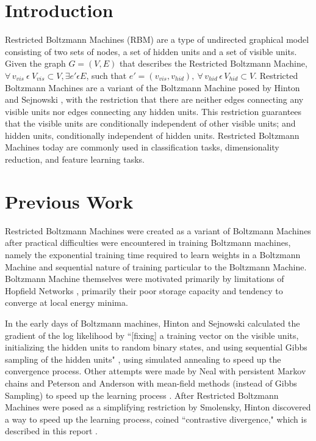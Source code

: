 \documentclass[journal]{IEEEtran}
\begin{document}
\section{Introduction}
Restricted Boltzmann Machines (RBM) are a type of undirected graphical model consisting of two sets of nodes, a set of hidden units and a set of visible units.  Given the graph $G = (V,E)$ that describes the Restricted Boltzmann Machine, $\forall \, v_{vis} \: \epsilon \: V_{vis} \subset V,\exists e'\epsilon E$, such that $ e'=(v_{vis}, v_{hid}),\: \forall \, v_{hid} \, \epsilon \, V_{hid} \subset V$.  Restricted Boltzmann Machines are a variant of the Boltzmann Machine posed by Hinton and Sejnowski \cite{ackley1985learning}, with the restriction that there are neither edges connecting any visible units nor edges connecting any hidden units.  This restriction guarantees that the visible units are conditionally independent of other visible units; and hidden units, conditionally independent of hidden units. Restricted Boltzmann Machines today are commonly used in classification tasks, dimensionality reduction, and feature learning tasks.

\section{Previous Work}
Restricted Boltzmann Machines were created as a variant of Boltzmann Machines after practical difficulties were encountered in training Boltzmann machines, namely the exponential training time required to learn weights in a Boltzmann Machine and sequential nature of training particular to the Boltzmann Machine.  Boltzmann Machine themselves were motivated primarily by limitations of Hopfield Networks \cite{hopfield1985neural}, primarily their poor storage capacity and tendency to converge at local energy minima.  

In the early days of Boltzmann machines, Hinton and Sejnowski calculated the gradient of the log likelihood by ``[fixing] a training vector on the visible units, initializing the hidden units to random binary states, and using sequential Gibbs sampling of the hidden units" \cite{ackley1985learning}, using simulated annealing to speed up the convergence process.  Other attempts were made by Neal with persistent Markov chains \cite{neal1992connectionist} and Peterson and Anderson with mean-field methods (instead of Gibbs Sampling) to speed up the learning process \cite{peterson1987mean}. After Restricted Boltzmann Machines were posed as a simplifying restriction by Smolensky, Hinton discovered a way to speed up the learning process, coined ``contrastive divergence," which is described in this report \cite{hinton2006fast,hinton2010practical}.
\end{document}
